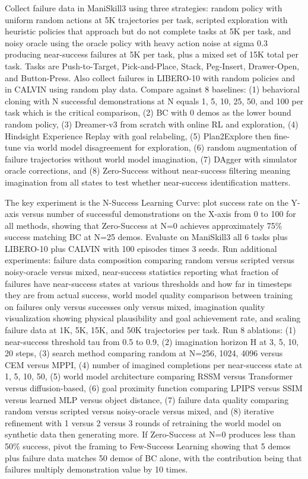 \documentclass[11pt,a4paper]{article}
\begin{document}
Collect failure data in ManiSkill3 using three strategies: random policy with uniform random actions at 5K trajectories per task, scripted exploration with heuristic policies that approach but do not complete tasks at 5K per task, and noisy oracle using the oracle policy with heavy action noise at sigma 0.3 producing near-success failures at 5K per task, plus a mixed set of 15K total per task. Tasks are Push-to-Target, Pick-and-Place, Stack, Peg-Insert, Drawer-Open, and Button-Press. Also collect failures in LIBERO-10 with random policies and in CALVIN using random play data. Compare against 8 baselines: (1) behavioral cloning with N successful demonstrations at N equals 1, 5, 10, 25, 50, and 100 per task which is the critical comparison, (2) BC with 0 demos as the lower bound random policy, (3) Dreamer-v3 from scratch with online RL and exploration, (4) Hindsight Experience Replay with goal relabeling, (5) Plan2Explore then fine-tune via world model disagreement for exploration, (6) random augmentation of failure trajectories without world model imagination, (7) DAgger with simulator oracle corrections, and (8) Zero-Success without near-success filtering meaning imagination from all states to test whether near-success identification matters.

The key experiment is the N-Success Learning Curve: plot success rate on the Y-axis versus number of successful demonstrations on the X-axis from 0 to 100 for all methods, showing that Zero-Success at N=0 achieves approximately 75\% success matching BC at N=25 demos. Evaluate on ManiSkill3 all 6 tasks plus LIBERO-10 plus CALVIN with 100 episodes times 3 seeds. Run additional experiments: failure data composition comparing random versus scripted versus noisy-oracle versus mixed, near-success statistics reporting what fraction of failures have near-success states at various thresholds and how far in timesteps they are from actual success, world model quality comparison between training on failures only versus successes only versus mixed, imagination quality visualization showing physical plausibility and goal achievement rate, and scaling failure data at 1K, 5K, 15K, and 50K trajectories per task. Run 8 ablations: (1) near-success threshold tau from 0.5 to 0.9, (2) imagination horizon H at 3, 5, 10, 20 steps, (3) search method comparing random at N=256, 1024, 4096 versus CEM versus MPPI, (4) number of imagined completions per near-success state at 1, 5, 10, 50, (5) world model architecture comparing RSSM versus Transformer versus diffusion-based, (6) goal proximity function comparing LPIPS versus SSIM versus learned MLP versus object distance, (7) failure data quality comparing random versus scripted versus noisy-oracle versus mixed, and (8) iterative refinement with 1 versus 2 versus 3 rounds of retraining the world model on synthetic data then generating more. If Zero-Success at N=0 produces less than 50\% success, pivot the framing to Few-Success Learning showing that 5 demos plus failure data matches 50 demos of BC alone, with the contribution being that failures multiply demonstration value by 10 times.
\end{document}
